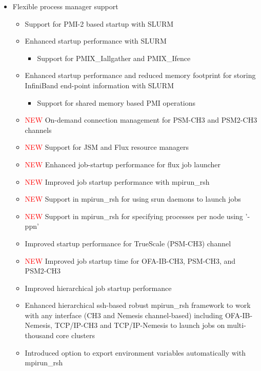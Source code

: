 \begin{itemize}
\begin{itemize}
  \end{itemize}
  \item  Flexible process manager support
     \begin{itemize}
      \item Support for PMI-2 based startup with SLURM
      \item  Enhanced startup performance with SLURM
        \begin{itemize}
            \item  Support for PMIX\_Iallgather and PMIX\_Ifence
        \end{itemize}
         \item   Enhanced startup performance and reduced memory
            footprint for storing InfiniBand end-point information with SLURM
        \begin{itemize}
            \item  Support for shared memory based PMI operations
        \end{itemize}
      \item  \textcolor{red}{NEW}  On-demand connection management for PSM-CH3 and PSM2-CH3 channels
      \item  \textcolor{red}{NEW}  Support for JSM and Flux resource managers
      \item  \textcolor{red}{NEW} Enhanced job-startup performance for flux job launcher
      \item  \textcolor{red}{NEW} Improved job startup performance with mpirun\_rsh
	  \item  \textcolor{red}{NEW} Support in mpirun\_rsh for using srun daemons to launch jobs
      \item  \textcolor{red}{NEW} Support in mpirun\_rsh for specifying processes per node using '-ppn'
      \item  Improved startup performance for TrueScale (PSM-CH3) channel
      \item  \textcolor{red}{NEW} Improved job startup time for OFA-IB-CH3, PSM-CH3, and PSM2-CH3
      \item  Improved hierarchical job startup performance
       \item  Enhanced hierarchical ssh-based robust mpirun\_rsh framework 
       to work with any interface (CH3 and Nemesis channel-based) including OFA-IB-Nemesis, 
       TCP/IP-CH3 and TCP/IP-Nemesis to launch jobs on multi-thousand core clusters
       \item  Introduced option to export environment variables automatically with mpirun\_rsh

\end{itemize}
\end{itemize}
